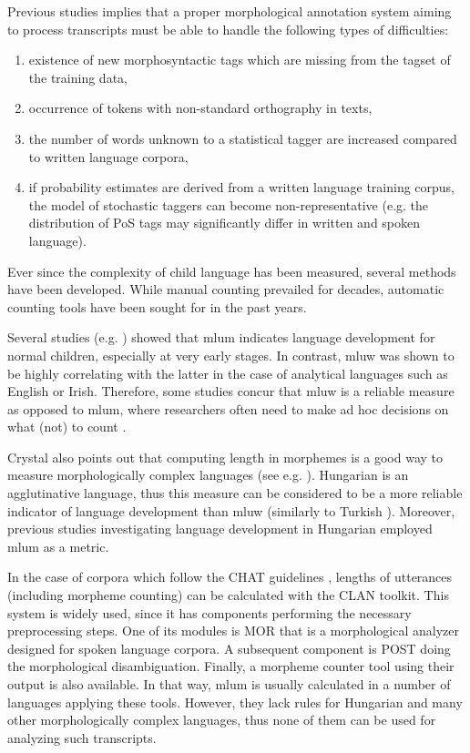 Previous studies implies that a proper morphological annotation system aiming to process transcripts must be able to handle the following types of difficulties:
\begin{enumerate}
 \item existence of new morphosyntactic tags which are missing from the tagset of the training data,
 \item occurrence of tokens with non-standard orthography in texts,
 \item the number of words unknown to a statistical tagger are increased compared to written language corpora,
 \item if probability estimates are derived from a written language training corpus, the model of stochastic taggers can become non-representative (e.g. the distribution of PoS tags may significantly differ in written and spoken language).
\end{enumerate}

Ever since the complexity of child language has been measured, several methods have been developed. While manual counting prevailed for decades, automatic counting tools have been sought for in the past years.

Several studies (e.g. \cite{Brown1973}) showed that \acrshort{mlum} indicates language development for normal children, especially at very early stages. 
In contrast, \gls{mluw} was shown to be highly correlating \cite{Hickey1991,Parker2005} with the latter in the case of analytical languages such as English or Irish. 
Therefore, some studies concur that \acrshort{mluw} is a reliable measure as opposed to \acrshort{mlum}, where researchers often need to make ad hoc decisions on what (not) to count \cite{Crystal1974}. 

Crystal also points out \cite{Crystal1974} that computing length in morphemes is a good way to measure morphologically complex languages (see e.g. \cite{Bowerman1973}). 
Hungarian is an agglutinative language, thus this measure can be considered to be a more reliable indicator of language development  than \acrshort{mluw} (similarly to Turkish \cite{saygin2010}). 
Moreover, previous studies investigating language development in Hungarian \cite{Reger1990,Weber2011} employed \acrshort{mlum} as a metric.

In the case of corpora which follow the CHAT guidelines \cite{macwhinney1991childes}, lengths of utterances (including morpheme counting) can be calculated with the CLAN \cite{MacWhinney1992} toolkit. 
This system is widely used, since it has components performing the necessary preprocessing steps. 
One of its modules is MOR that is a morphological analyzer designed for spoken language corpora. 
A subsequent component is POST doing the morphological disambiguation. 
Finally, a morpheme counter tool using their output is also available. 
In that way, \acrshort{mlum} is usually calculated in a number of languages applying these tools.
However, they lack rules for Hungarian and many other morphologically complex languages, thus none of them can be used for analyzing such transcripts.

